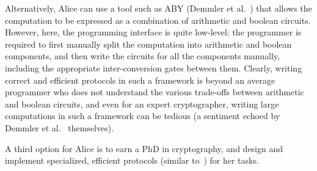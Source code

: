 
Alternatively, Alice can use a tool such as ABY (Demmler et
al.~\cite{aby}) that allows
the computation to be expressed as a combination of arithmetic and
boolean circuits. However, here, the programming interface is quite
low-level: the programmer is required to first manually split the
computation into arithmetic and boolean components, and then write the
circuits for all the components manually, including the appropriate
inter-conversion gates between them. Clearly, writing correct
and efficient protocols in such a framework is beyond an average
programmer who does not understand the various trade-offs between
arithmetic and boolean circuits, and even for an expert cryptographer,
writing large computations in such a framework can be tedious (a sentiment echoed by Demmler et al.~\cite{aby} themselves).

A third option for Alice is to earn a PhD in cryptography, and design
and implement specialized, efficient \mpc protocols (similar
to~\cite{shafindss,wu,minionn,valeriaMatrix}) for her tasks.







